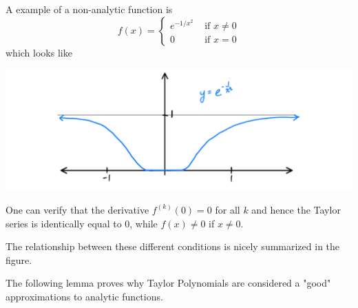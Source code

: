 \documentclass{article}
\begin{document}
    \begin{example}
      A example of a non-analytic function is
      \[f(x) = \begin{cases}
      e^{-1/x^2} & \text{ if } x \neq 0 \\
      0 & \text{ if } x = 0
      \end{cases}\]
      which looks like
      \begin{center}
          \includegraphics[scale=0.25]{img/Infinitely_Differentiable_Non_Analytic_Function.PNG}
      \end{center}
      One can verify that the derivative $f^{(k)} (0) = 0$ for all $k$ and hence the Taylor series is identically equal to $0$, while $f(x) \neq 0$ if $x \neq 0$. 
    \end{example}

    The relationship between these different conditions is nicely summarized in the figure. 
    \begin{center}
    \end{center}

    The following lemma proves why Taylor Polynomials are considered a "good" approximations to analytic functions. 
\end{document}
